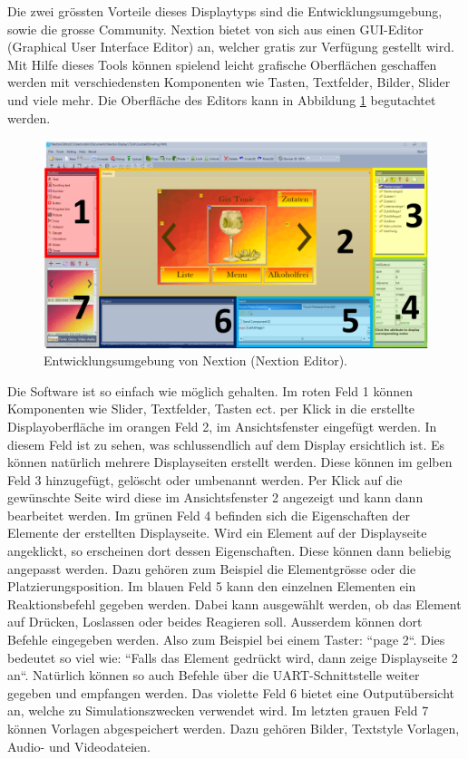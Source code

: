Die zwei grössten Vorteile dieses Displaytyps sind die Entwicklungsumgebung, sowie die grosse Community. Nextion bietet von sich aus einen GUI-Editor (Graphical User Interface Editor) an, welcher gratis zur Verfügung gestellt wird. Mit Hilfe dieses Tools können spielend leicht grafische Oberflächen geschaffen werden mit verschiedensten Komponenten wie Tasten, Textfelder, Bilder, Slider und viele mehr. Die Oberfläche des Editors kann in Abbildung \ref{fig:Nextion_Editor} begutachtet werden.

\begin{figure}[h!]
\centering
\includegraphics[width=\textwidth]{graphics/Nextion_Editor.png}
\caption{Entwicklungsumgebung von Nextion (Nextion Editor).}
\label{fig:Nextion_Editor}
\end{figure}

Die Software ist so einfach wie möglich gehalten. Im roten Feld 1 können Komponenten wie Slider, Textfelder, Tasten ect. per Klick in die erstellte Displayoberfläche im orangen Feld 2, im Ansichtsfenster eingefügt werden. In diesem Feld ist zu sehen, was schlussendlich auf dem Display ersichtlich ist. Es können natürlich mehrere Displayseiten erstellt werden. Diese können im gelben Feld 3 hinzugefügt, gelöscht oder umbenannt werden. Per Klick auf die gewünschte Seite wird diese im Ansichtsfenster 2 angezeigt und kann dann bearbeitet werden. Im grünen Feld 4 befinden sich die Eigenschaften der Elemente der erstellten Displayseite. Wird ein Element auf der Displayseite angeklickt, so erscheinen dort dessen Eigenschaften. Diese können dann beliebig angepasst werden. Dazu gehören zum Beispiel die Elementgrösse oder die Platzierungsposition. Im blauen Feld 5 kann den einzelnen Elementen ein Reaktionsbefehl gegeben werden. Dabei kann ausgewählt werden, ob das Element auf Drücken, Loslassen oder beides Reagieren soll. Ausserdem können dort Befehle eingegeben werden. Also zum Beispiel bei einem Taster: ``page 2``. Dies bedeutet so viel wie: ``Falls das Element gedrückt wird, dann zeige Displayseite 2 an``. Natürlich können so auch Befehle über die UART-Schnittstelle weiter gegeben und empfangen werden. Das violette Feld 6 bietet eine Outputübersicht an, welche zu Simulationszwecken verwendet wird. Im letzten grauen Feld 7 können Vorlagen abgespeichert werden. Dazu gehören Bilder, Textstyle Vorlagen, Audio- und Videodateien.